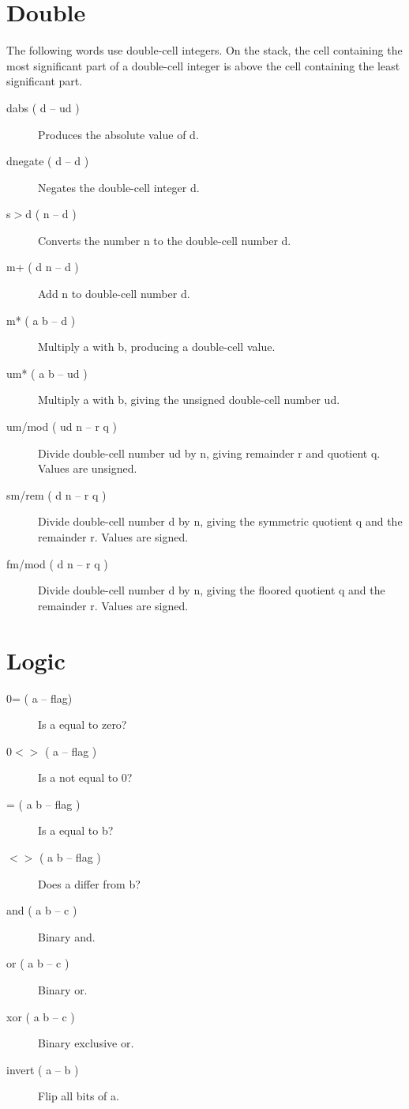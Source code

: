 \section{Double}

The following words use double-cell integers. On the stack, the cell containing the most significant part of a double-cell integer is above the cell containing the least significant part. 

\begin{description}
\item[dabs ( d -- ud )] Produces the absolute value of d.
\item[dnegate ( d -- d )] Negates the double-cell integer d.
\item[s$>$d ( n -- d )] Converts the number n to the double-cell number d.
\item[m+ ( d n -- d )] Add n to double-cell number d.
\item[m* ( a b -- d )] Multiply a with b, producing a double-cell value.
\item[um* ( a b -- ud )] Multiply a with b, giving the unsigned double-cell number ud.
\item[um/mod ( ud n -- r q )] Divide double-cell number ud by n, giving remainder r and quotient q. Values are unsigned.
\item[sm/rem ( d n -- r q )] Divide double-cell number d by n, giving the symmetric quotient q and the remainder r. Values are signed.
\item[fm/mod ( d n -- r q )] Divide double-cell number d by n, giving the floored quotient q and the remainder r. Values are signed.
\end{description}

\section{Logic}

\begin{description}
\item[0= ( a -- flag)] Is a equal to zero?
\item[0$<>$ ( a -- flag )] Is a not equal to 0?
\item[= ( a b -- flag )] Is a equal to b?
\item[$<>$ ( a b -- flag )] Does a differ from b?
\item[and ( a b -- c )] Binary and.  
\item[or ( a b -- c )] Binary or.  
\item[xor ( a b -- c )] Binary exclusive or.  
\item[invert ( a -- b )] Flip all bits of a.  
\end{description}

